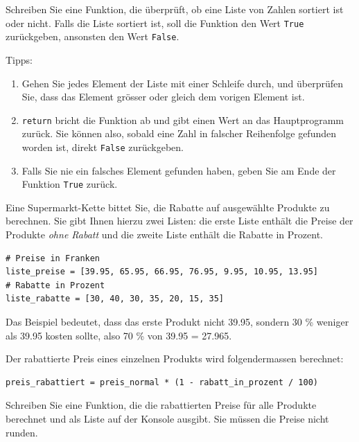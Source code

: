 \begin{mychallenge}
	Schreiben Sie eine Funktion, die überprüft, ob eine Liste von Zahlen sortiert ist oder nicht. Falls die Liste sortiert ist, soll die Funktion den Wert \lstinline|True| zurückgeben, ansonsten den Wert \lstinline|False|.

	Tipps: %
	\begin{enumerate}
		\item Gehen Sie jedes Element der Liste mit einer Schleife durch, und überprüfen Sie, dass das Element grösser oder gleich dem vorigen Element ist.
		\item \lstinline|return| bricht die Funktion ab und gibt einen Wert an das Hauptprogramm zurück. Sie können also, sobald eine Zahl in falscher Reihenfolge gefunden worden ist, direkt \lstinline|False| zurückgeben.
		\item Falls Sie nie ein falsches Element gefunden haben, geben Sie am Ende der Funktion \lstinline|True| zurück.
	\end{enumerate}
	\begin{myanswer}
		
	\end{myanswer}
\end{mychallenge}

\begin{myexercise}
	Eine Supermarkt-Kette bittet Sie, die Rabatte auf ausgewählte Produkte zu berechnen. Sie gibt Ihnen hierzu zwei Listen: die erste Liste enthält die Preise der Produkte \textit{ohne Rabatt} und die zweite Liste enthält die Rabatte in Prozent.

	\begin{lstlisting}
# Preise in Franken
liste_preise = [39.95, 65.95, 66.95, 76.95, 9.95, 10.95, 13.95] 
# Rabatte in Prozent
liste_rabatte = [30, 40, 30, 35, 20, 15, 35] 
\end{lstlisting}

	Das Beispiel bedeutet, dass das erste Produkt nicht 39.95, sondern 30 \% weniger als 39.95 kosten sollte, also 70 \% von 39.95 = 27.965.

	Der rabattierte Preis eines einzelnen Produkts wird folgendermassen berechnet:
	\begin{lstlisting}
preis_rabattiert = preis_normal * (1 - rabatt_in_prozent / 100)
\end{lstlisting}
	Schreiben Sie eine Funktion, die die rabattierten Preise für alle Produkte berechnet und als Liste auf der Konsole ausgibt. Sie müssen die Preise nicht runden.

	\begin{myanswer}
		
	\end{myanswer}
\end{myexercise}

